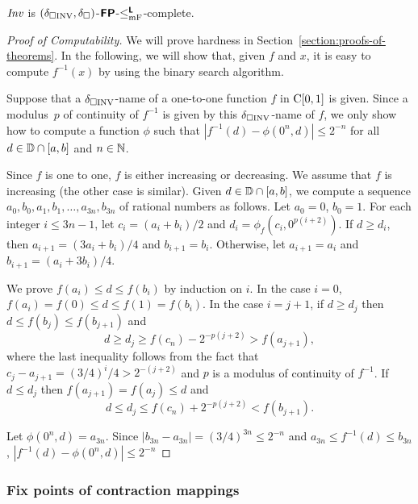 \documentclass[envcountsame,orivec,oribibl]{llncs}
\begin{document}
\begin{theorem}
 \label{theorem:INV-is-P-complete}
 $\mathit{Inv}$ is $(\delta _{\square \mathrm{INV}}, \delta _\square)$-$\text{\bfseries \sffamily \upshape FP}$-$\leq _{\mathrm{mF}} ^{\text{\bfseries \sffamily \upshape L}}$-complete.
\end{theorem}


\begin{proof}[Proof of Computability]
We will prove hardness in Section~\ref{section:proofs-of-theorems}.
In the following, we will show that, 
given $f$ and $x$, 
it is easy to compute $f^{-1}(x)$ by using the binary search algorithm.

Suppose that a $\delta _{\square \mathrm{INV}}$-name of a one-to-one function $f$ in $\mathrm C [0, 1]$ is given. 
Since a modulus~$p$ of continuity of $f ^{-1}$ is given by this $\delta _{\square \mathrm{INV}}$-name of $f$,
we only show how to compute a function $\phi$ such that 
$|f^{-1}(d) - \phi(0^n, d)| \le 2^{-n}$ for all $d \in \mathbb D \cap [a, b]$ and $n \in \mathbb N$.

Since $f$ is one to one, $f$ is either increasing or decreasing. 
We assume that $f$ is increasing (the other case is similar).
Given $d \in \mathbb D \cap [a, b]$, 
we compute a sequence  $a_0, b_0, a_1,b_1, \dots, a_{3n}, b_{3n}$ of rational numbers as follows.
Let $a_0 = 0$, $b_0 = 1$.
For each integer $i \le 3n-1$,
let $c_i = (a_i+b_i)/2$ and $d_i = \phi_f(c_i, 0^{p(i+2)})$.
If $d \ge d_i$, then $a_{i+1} = (3a_i+b_i)/4$ and $b_{i+1} = b_i$. 
Otherwise, let $a_{i+1} = a_i$ and $b_{i+1} = (a_i+3b_i)/4$.

We prove $f(a_i) \leq d \leq f(b_i)$ by induction on $i$.
In the case $i = 0$, $f(a_i) = f(0) \le d \le f(1) = f(b_i)$.
In the case $i=j+1$, if $d \ge d_j$ then $d \le f(b_j) \le f(b_{j+1})$ and
\begin{equation}
 d \ge d_j \ge f(c_n) - 2^{-p(j+2)} > f(a_{j+1}),
\end{equation}
where the last inequality follows from the fact that $c_j - a_{j+1} = (3/4)^i/4 > 2^{-(j+2)}$ and $p$ is a modulus of continuity of $f^{-1}$.
If $d \le d_j$ then $f(a_{j+1}) = f(a_j) \le d$ and 
\begin{equation}
 d \le d_j \le f(c_n) + 2^{-p(j+2)} < f(b_{j+1}).
\end{equation}

Let $\phi(0^n, d) = a_{3n}$.
Since $|b_{3n} - a_{3n}| = (3/4)^{3n} \le 2^{-n}$ and
$a_{3n} \le f^{-1}(d) \le b_{3n}$,
$|f^{-1}(d) - \phi(0^n, d)| \le 2^{-n}$
\end{proof}

\subsubsection{Fix points of contraction mappings}
\end{document}
